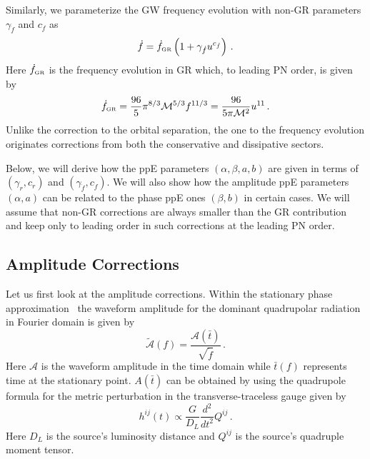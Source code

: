 \documentclass[prd,twocolumn,nofootinbib]{revtex4-1}
\newcommand{\GR}{{\mbox{\tiny GR}}}
\begin{document}

Similarly, we parameterize the GW frequency evolution with non-GR parameters $\gamma_{\dot{f}}$ and $c_{\dot{f}}$  as
\begin{equation}\label{eq:2m}
\dot{f}=\dot{f}_{\GR}\left(1+\gamma_{\dot{f}}u^{c_{\dot{f}}}\right)\,.
\end{equation}
Here $\dot{f}_{\GR}$ is the frequency evolution in GR which, to leading PN order, is given by~\cite{cutlerflanagan,Blanchet:1995ez}
\begin{align}\label{eq:2s}
\dot{f}_{\GR}=\frac{96}{5}\pi^{8/3}\mathcal{M}^{5/3}f^{11/3}=\frac{96}{5\pi\mathcal{M}^2}u^{11}\,.
\end{align}
Unlike the correction to the orbital separation, the one to the frequency evolution originates corrections from both the conservative and dissipative sectors.

Below, we will derive how the ppE parameters $(\alpha, \beta, a, b)$ are given in terms of $(\gamma_r,c_r)$ and $(\gamma_{\dot{f}},c_{\dot{f}})$. We will also show how the amplitude ppE parameters $(\alpha, a)$ can be related to the phase ppE ones $(\beta,b)$ in certain cases. We will assume that non-GR corrections are always smaller than the GR contribution and keep only to leading order in such corrections at the leading PN order.

 \subsection{Amplitude Corrections}
 
Let us first look at the amplitude corrections.  Within the stationary phase approximation~\cite{PhysRevD.62.084036,Yunes:2009yz} the waveform amplitude for the dominant quadrupolar radiation in Fourier domain is given by
 \begin{equation}\label{eq:2h1}
\tilde{\mathcal{A}}(f)=\frac{\mathcal{A}(\bar{t})}{\sqrt{\dot{f}}}\,.
\end{equation}
Here $\mathcal A$ is the waveform amplitude in the time domain while $\bar t (f)$ represents time at the stationary point. $A(\bar t)$ can be obtained by using the quadrupole formula for the metric perturbation in the transverse-traceless gauge given by~\cite{Blanchet:2002av}
 \begin{equation}\label{eq:2h2}
h^{ij}(t)\propto \frac{G}{D_L}\frac{d^2 }{d t^2}Q^{ij}\,.
 \end{equation}
Here $D_L$ is the source's luminosity distance and $Q^{ij}$ is the source's quadruple moment tensor. 
\end{document}
